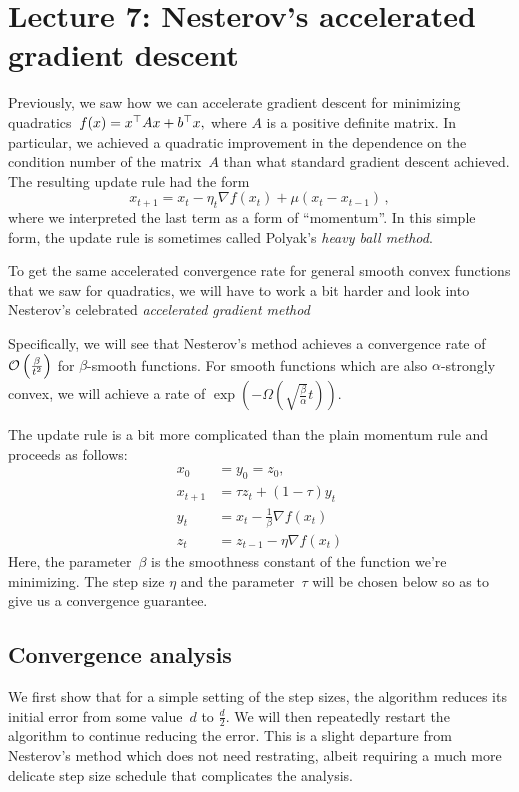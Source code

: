 \section{Lecture 7: Nesterov’s accelerated gradient descent}

Previously, we saw how we can accelerate gradient descent for minimizing
quadratics~$f(x)=x^\top A x+b^\top x,$ where $A$ is a positive definite
matrix. In particular, we achieved a quadratic improvement in the dependence
on the condition number of the matrix~$A$ than what standard gradient descent
achieved. The resulting update rule had the form
\[
x_{t+1} = x_t -\eta_t\nabla f(x_t) + \mu(x_t-x_{t-1})\,,
\]
where we interpreted the last term as a form of ``momentum''. In this simple
form, the update rule is sometimes called Polyak's \emph{heavy ball method}.

To get the same accelerated convergence rate for general smooth convex functions
that we saw for quadratics, we will have to work a bit harder and look into
Nesterov's celebrated \emph{accelerated gradient method}~\cite{Nesterov83,
Nesterov04}

Specifically, we will see that Nesterov's method achieves a convergence rate
of~${\cal O} \left(\frac{\beta}{t^2}\right)$ for $\beta$-smooth functions. For smooth
functions which are also $\alpha$-strongly convex, we will achieve a rate of
$\exp\left( -\Omega\left(\sqrt{\frac{\beta}{\alpha}} t\right)\right)$. 

The update rule is a bit more complicated than the plain momentum rule 
and proceeds as follows:
\begin{align*}
x_0 &= y_0 = z_0, \\
x_{t+1} &= \tau z_t + (1 - \tau) y_t \tag{$t\ge 0$}\\
y_t &= x_t - \frac{1}{\beta} \nabla f(x_t) \tag{$t\ge 1$}\\
z_t &= z_{t-1} - \eta\nabla f(x_t)\tag{$t\ge 1$}
\end{align*}
Here, the parameter~$\beta$ is the smoothness constant of the function we're
minimizing. The step size $\eta$ and the parameter~$\tau$ will be chosen below
so as to give us a convergence guarantee.

\subsection{Convergence analysis}

We first show that for a simple setting of the step sizes, the algorithm reduces
its initial error from some value~$d$ to $\frac{d}{2}.$ We will then repeatedly
restart the algorithm to continue reducing the error. This is a slight departure
from Nesterov's method which does not need restrating, albeit requiring a much
more delicate step size schedule that complicates the analysis.

